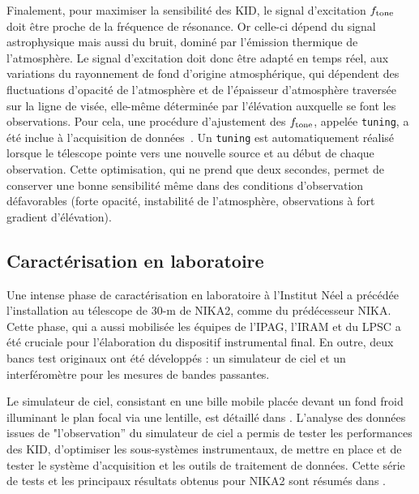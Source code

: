 Finalement, pour maximiser la sensibilité des KID, le signal d'excitation
$f_{\rm{tone}}$ doit être proche de la fréquence de résonance. Or
celle-ci dépend du signal astrophysique mais aussi du bruit, dominé
par l'émission thermique de l'atmosphère. Le signal d'excitation doit
donc être adapté en temps réel, aux variations du rayonnement de fond 
d'origine atmosphérique, qui dépendent des fluctuations d'opacité de
l'atmosphère et de l'épaisseur d'atmosphère traversée sur la ligne de
visée, elle-même déterminée par l'élévation auxquelle se font les
observations. Pour cela, une procédure d'ajustement des
$f_{\rm{tone}}$, appelée {\tt tuning}, a été inclue à l'acquisition
de données~\citep{Adam2018}. Un {\tt tuning} est automatiquement
réalisé lorsque le télescope pointe vers une nouvelle source et au
début de chaque observation. Cette optimisation, qui ne prend que deux
secondes, permet de conserver une bonne sensibilité même dans des
conditions d'observation défavorables (forte opacité, instabilité de
l'atmosphère, observations à fort gradient d'élévation).



\subsection{Caractérisation en laboratoire}
\label{se:bandpass}

Une intense phase de caractérisation en laboratoire à l'Institut Néel
a précédée l'installation au télescope de 30-m de NIKA2, comme du
prédécesseur NIKA. Cette phase, qui a aussi mobilisée les équipes de
l'IPAG, l'IRAM et du LPSC a été cruciale pour l'élaboration du
dispositif instrumental final. En outre, deux bancs test originaux ont
été développés : un simulateur de ciel et un interféromètre
pour les mesures de bandes passantes.

Le simulateur de ciel, consistant en une bille mobile placée devant un
fond froid illuminant le plan focal via une lentille, est détaillé dans
\citet{Catalano2014, Monfardini2011_NIKA}. L'analyse des données issues de
"l'observation'' du simulateur de ciel a permis de tester les
performances des KID, d'optimiser les sous-systèmes instrumentaux, de
mettre en place et de tester le système d'acquisition et les outils de
traitement de données. Cette série de tests et les principaux
résultats obtenus pour NIKA2 sont résumés dans \citet{Adam2018}.


